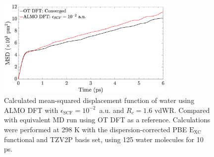 \documentclass[aps,prl,reprint,amsmath,amssymb]{revtex4-1}
\begin{document}
\begin{figure}[!htb]
\includegraphics[trim={0cm 0cm 0.1cm 0.1cm},clip,width=8.6cm]{Diffusion_Comparison.eps}
\caption{\label{fig:diffusion} Calculated mean-squared displacement function of water using ALMO DFT with $\epsilon_{\text{SCF}} = 10^{-2}$~a.u. and $R_{c} = 1.6$ vdWR.
Compared with equivalent MD run using OT DFT as a reference.
Calculations were performed at 298 K with the dispersion-corrected PBE $\mathrm{E_{XC}}$ functional and TZV2P basis set, using 125 water molecules for 10 ps.}
\end{figure}

\fi %
\end{document}
